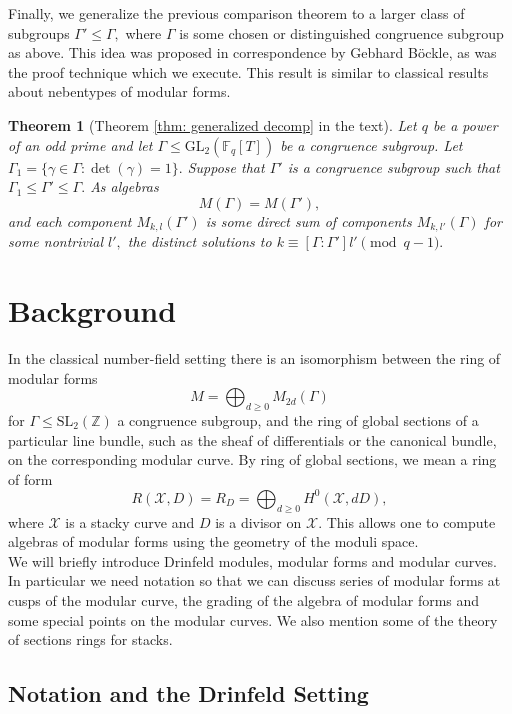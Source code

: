 \documentclass[11pt]{amsart}
\newtheorem{theorem}{Theorem}[section]
\theoremstyle{definition}
\numberwithin{equation}{section}
\newcommand{\GL}{\mathrm{GL}} 	%
\newcommand{\SL}{\mathrm{SL}} 	%
\newcommand{\sX}{\mathscr{X}}		%
\newcommand{\bbF}{\mathbb{F}}		%
\newcommand{\bbZ}{\mathbb{Z}}		%
\begin{document}
		Finally, we generalize the previous comparison theorem to a larger class of subgroups $\Gamma'\leq \Gamma,$ where $\Gamma$ is some chosen or distinguished congruence subgroup as above. This idea was proposed in correspondence by Gebhard B\"ockle, as was the proof technique which we execute. This result is similar to classical results about nebentypes of modular forms. 
		\begin{theorem}[Theorem \ref{thm: generalized decomp} in the text]
			Let $q$ be a power of an odd prime and let $\Gamma\leq \GL_2(\bbF_q[T])$ be a congruence subgroup. Let $\Gamma_1=\{\gamma\in \Gamma: \det(\gamma)=1\}.$ Suppose that $\Gamma'$ is a congruence subgroup such that $\Gamma_1\leq \Gamma'\leq \Gamma.$ As algebras
			\[M(\Gamma)=M(\Gamma'),\] and each component $M_{k,l}(\Gamma')$ is some direct sum of components $M_{k,l'}(\Gamma)$ for some nontrivial $l',$ the distinct solutions to $k\equiv [\Gamma:\Gamma']l'\pmod{q-1}.$
		\end{theorem}
		
		\section{Background} %
		
		In the classical number-field setting there is an isomorphism between the ring of modular forms 
		\[M = \bigoplus_{d\geq 0} M_{2d}(\Gamma)\]
		for $\Gamma\leq \SL_2(\bbZ)$ a congruence subgroup, and the ring of global sections of a particular line bundle, such as the sheaf of differentials or the canonical bundle, on the corresponding modular curve. By ring of global sections, we mean a ring of form 
		\[R(\sX,D)=R_D=\bigoplus_{d\geq 0}H^0(\sX,dD),\]
		where $\sX$ is a stacky curve and $D$ is a divisor on $\sX.$
		This allows one to compute algebras of modular forms using the geometry of the moduli space.\\
		
		We will briefly introduce Drinfeld modules, modular forms and modular  curves. In particular we need notation so that we can discuss series of modular forms at cusps of the modular curve, the grading of the algebra of modular forms and some special points on the modular curves. We also mention some of the theory of sections rings for stacks.  
		
		\subsection{Notation and the Drinfeld Setting}
		
\end{document}
